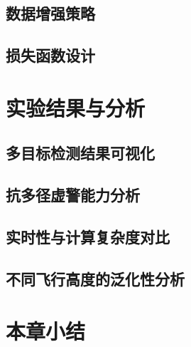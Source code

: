 
\subsection{数据增强策略}


\subsection{损失函数设计}


\section{实验结果与分析}

\subsection{多目标检测结果可视化}


\subsection{抗多径虚警能力分析}


\subsection{实时性与计算复杂度对比}


\subsection{不同飞行高度的泛化性分析}


\section{本章小结}


